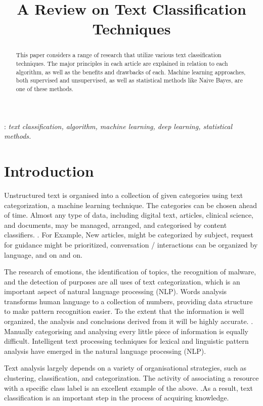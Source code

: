 \documentclass[a4paper]{article}
\title{A Review on Text Classification Techniques}
\begin{document}
\maketitle

\begin{abstract}
This paper considers a range of research that utilize various text classification techniques. The major principles in each article are explained in relation to each algorithm, as well as the benefits and drawbacks of each. Machine learning approaches, both supervised and unsupervised, as well as statistical methods like Naive Bayes, are one of these methods.
 \end{abstract}
:\textit{ text classification, algorithm, machine learning, deep learning, statistical methods.}


\section{Introduction}
Unstructured text is organised into a collection of given categories using text categorization, a machine learning technique. The categories can be chosen ahead of time. Almost any type of data, including digital text, articles, clinical science, and documents, may be managed, arranged, and categorised by content classifiers. \cite{ES1}. For Example, New articles, might be categorized by subject, request for guidance might be prioritized, conversation / interactions can be organized by language, and on and on.

The research of emotions, the identification of topics, the recognition of malware, and the detection of purposes are all uses of text categorization, which is an important aspect of natural language processing (NLP). Words analysis transforms human language to a collection of numbers, providing data structure to make pattern recognition easier. To the extent that the information is well organized, the analysis and conclusions derived from it will be highly accurate. \cite{ES2}. Manually categorising and analysing every little piece of information is equally difficult.
Intelligent text processing techniques for lexical and linguistic pattern analysis have emerged in the natural language processing (NLP).

Text analysis largely depends on a variety of organisational strategies, such as clustering, classification, and categorization. The activity of associating a resource with a specific class label is an excellent example of the above. \cite{ES3}.As a result, text classification is an important step in the process of acquiring knowledge.
\end{document}
